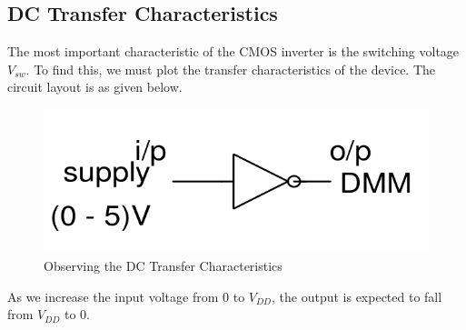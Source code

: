 \documentclass[a4paper, 11pt]{article}
\begin{document}
\subsection{DC Transfer Characteristics}

The most important characteristic of the CMOS inverter is the switching voltage $V_{sw}$. To find this, we must plot the transfer characteristics of the device. The circuit layout is as given below.

\begin{figure}[h]
\centering
\includegraphics[scale=0.3]{fig1}
\caption{Observing the DC Transfer Characteristics}
\end{figure}

\hspace*{-2em} As we increase the input voltage from 0 to $V_{DD}$, the output is expected to fall from $V_{DD}$ to 0.
\end{document}
